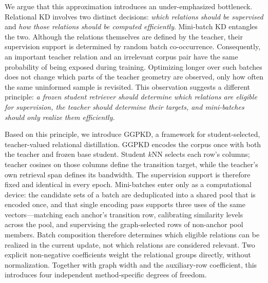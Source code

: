 We argue that this approximation introduces an under-emphasized bottleneck.
Relational KD involves two distinct decisions: \emph{which relations should be
supervised} and \emph{how those relations should be computed efficiently}.
Mini-batch KD entangles the two. Although the relations themselves are defined
by the teacher, their supervision support is determined by random batch
co-occurrence. Consequently, an important teacher relation and an irrelevant
corpus pair have the same probability of being exposed during training.
Optimizing longer over such batches does not change which parts of the teacher
geometry are observed, only how often the same uninformed sample is revisited.
This observation suggests a different principle: \emph{a frozen student
retriever should determine which relations are eligible for supervision, the
teacher should determine their targets, and mini-batches should only realize
them efficiently.}

Based on this principle, we introduce \textsc{GGPKD}, a framework for
student-selected, teacher-valued relational distillation. GGPKD encodes the
corpus once with both the teacher and frozen base student. Student $k$NN selects
each row's columns; teacher cosines on those columns define the transition
target, while the teacher's own retrieval span defines its bandwidth. The
supervision support is therefore fixed and identical in every epoch.
Mini-batches enter only as a computational device:
the candidate sets of a batch are deduplicated into a shared pool that is
encoded once, and that single encoding pass supports three uses of the same
vectors---matching each anchor's transition row, calibrating similarity levels
across the pool, and supervising the graph-selected rows of non-anchor pool
members. Batch composition therefore determines which eligible relations can be
realized in the current update, not which relations are considered relevant.
Two explicit non-negative coefficients weight the relational groups directly,
without normalization. Together with graph width and the auxiliary-row
coefficient, this introduces four independent method-specific degrees of freedom.

